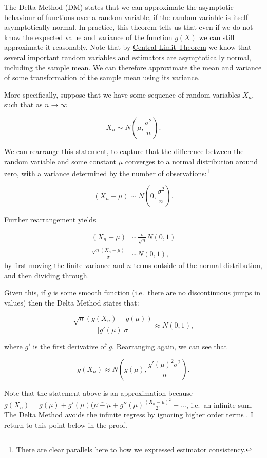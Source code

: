 \documentclass[
]{book}
\begin{document}
The Delta Method (DM) states that we can approximate the asymptotic behaviour of functions over a random variable, if the random variable is itself asymptotically normal. In practice, this theorem tells us that even if we do not know the expected value and variance of the function \(g(X)\) we can still approximate it reasonably. Note that by \protect\hyperlink{clt}{Central Limit Theorem} we know that several important random variables and estimators are asymptotically normal, including the sample mean. We can therefore approximate the mean and variance of some transformation of the sample mean using its variance.

More specifically, suppose that we have some sequence of random variables \(X_n\), such that as \(n\to\infty\)

\[
X_n \sim N(\mu,\frac{\sigma^2}{n}).
\]

We can rearrange this statement, to capture that the difference between the random variable and some constant \(\mu\) converges to a normal distribution around zero, with a variance determined by the number of observations:\footnote{There are clear parallels here to how we expressed \href{\%7B\#estimator_consistency\%7D\%20in\%20the\%20previous\%20chapter}{estimator consistency}.}

\[
(X_n - \mu) \sim N(0, \frac{\sigma^2}{n}).
\]

Further rearrangement yields

\[
\begin{aligned}
(X_n - \mu) &\sim \frac{\sigma}{\sqrt{n}}N(0,1) \\
\frac{\sqrt{n}(X_n - \mu)}{\sigma} &\sim N(0,1),
\end{aligned}
\]
by first moving the finite variance and \(n\) terms outside of the normal distribution, and then dividing through.

Given this, if \(g\) is some smooth function (i.e.~there are no discontinuous jumps in values) then the Delta Method states that:

\[
\frac{\sqrt{n}(g(X_n) - g(\mu))}{|g'(\mu)|\sigma} \approx N(0,1),
\]

where \(g'\) is the first derivative of \(g\). Rearranging again, we can see that

\[
g(X_n) \approx N\left(g(\mu), \frac{g'(\mu)^2\sigma^2}{n}\right).
\]

Note that the statement above is an approximation because \(g(X_n) = g(\mu) + g'(\mu)(\hat{\mu-\mu} + g''(\mu)\frac{(X_n - \mu)^2}{2!}+...\), i.e.~an infinite sum. The Delta Method avoids the infinite regress by ignoring higher order terms \citep{liu_2012}. I return to this point below in the proof.
\end{document}
